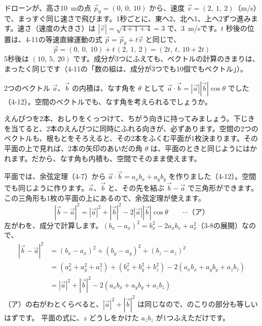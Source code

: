 ドローンが、高さ\qty{10}{m}の点 $\vec p_0=(0,\ 0,\ 10)$ から、速度 $\vec v=(2,\ 1,\ 2)$（m/s）で、まっすぐ同じ速さで飛びます。1秒ごとに、東へ2、北へ1、上へ2ずつ進みます。速さ（速度の大きさ）は $|\vec v|=\sqrt{4+1+4}=3$ で、\qty{3}{m/s}です。$t$ 秒後の位置は、4-11の等速直線運動の式 $\vec p=\vec p_0+t\vec v$ と同じで、
\[ \vec p=(0,\ 0,\ 10)+t\,(2,\ 1,\ 2)=(2t,\ t,\ 10+2t) \]
5秒後は $(10,\ 5,\ 20)$ です。成分が3つにふえても、ベクトルの計算のきまりは、まったく同じです（4-11の「数の組は、成分が3つでも10個でもベクトル」）。


\leavevmode\label{bk:4-13:naiseki}2つのベクトル $\vec a$、$\vec b$ の内積は、なす角を $\theta$ として $\vec a\cdot\vec b=|\vec a||\vec b|\cos\theta$ でした（4-12）。空間のベクトルでも、なす角を考えられるでしょうか。

えんぴつを2本、おしりをくっつけて、ちがう向きに持ってみましょう。下じきを当てると、2本のえんぴつに同時にふれる向きが、必ずあります。空間の2つのベクトルも、根もとをそろえると、その2本をふくむ平面が1枚決まります。その平面の上で見れば、2本の矢印のあいだの角 $\theta$ は、平面のときと同じようにはかれます。だから、なす角も内積も、空間でそのまま使えます。

平面では、余弦定理（4-7）から $\vec a\cdot\vec b=a_xb_x+a_yb_y$ を作りました（4-12）。空間でも同じように作ります。$\vec a$、$\vec b$ と、その先を結ぶ $\vec b-\vec a$ で三角形ができます。この三角形も1枚の平面の上にあるので、余弦定理が使えます。
\[ |\vec b-\vec a|^2=|\vec a|^2+|\vec b|^2-2|\vec a||\vec b|\cos\theta\qquad\cdots\text{（ア）} \]
左がわを、成分で計算します。$(b_x-a_x)^2=b_x^2-2a_xb_x+a_x^2$（3-8の展開）なので、
\begin{align*}
|\vec b-\vec a|^2&=(b_x-a_x)^2+(b_y-a_y)^2+(b_z-a_z)^2\\
&=(a_x^2+a_y^2+a_z^2)+(b_x^2+b_y^2+b_z^2)-2(a_xb_x+a_yb_y+a_zb_z)\\
&=|\vec a|^2+|\vec b|^2-2(a_xb_x+a_yb_y+a_zb_z)
\end{align*}
（ア）の右がわとくらべると、$|\vec a|^2+|\vec b|^2$ は同じなので、のこりの部分も等しいはずです。
平面の式に、$z$ どうしをかけた $a_zb_z$ が1つふえただけです。

